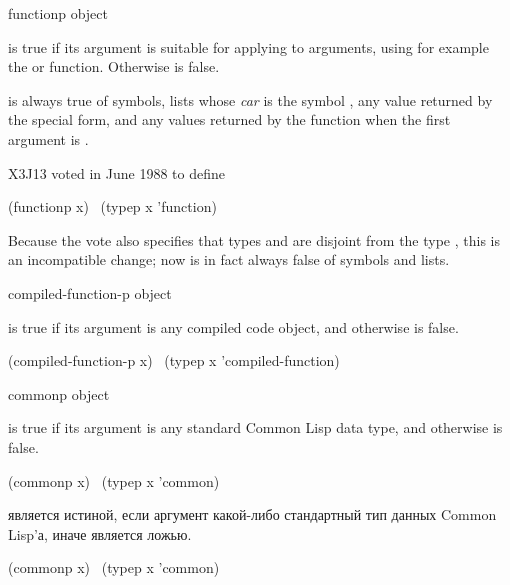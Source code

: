 \begin{defun}[Function]
functionp object

\begin{obsolete}
 is true if its argument is suitable for applying
to arguments, using for example the  or  function.
Otherwise  is false.

 is always true of symbols, lists whose \emph{car}
is the symbol , any value returned by the 
special form, and any values returned by the function 
when the first argument is {\nil}.
\end{obsolete}
\begin{newer}
X3J13 voted in June 1988 
to define
\begin{lisp}
(functionp x) \EQ\ (typep x 'function)
\end{lisp}
Because the vote also specifies that types  and  are disjoint
from the type , this is an incompatible change;
now  is in fact always false of symbols and lists.
\end{newer}
\end{defun}

\begin{defun}[Function]
compiled-function-p object

 is true if its argument is any compiled code object,
and otherwise is false.
\begin{lisp}
(compiled-function-p x) \EQ\ (typep x 'compiled-function)
\end{lisp}
\end{defun}

\begin{obsolete}
\begin{defun}[Function]
commonp object

 is true if its argument is any standard Common Lisp data type,
and otherwise is false.
\begin{lisp}
(commonp x) \EQ\ (typep x 'common)
\end{lisp}

 является истиной, если аргумент какой-либо стандартный тип данных
Common Lisp'а, иначе является ложью.
\begin{lisp}
(commonp x) \EQ\ (typep x 'common)
\end{lisp}
\end{defun}
\end{obsolete}

